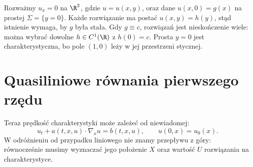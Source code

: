 \begin{kontrprzyklad}
\label{ex:pde2-char-data}
Rozważmy $u_x=0$ na $\R^2$, gdzie $u=u(x,y)$,
oraz dane $u(x,0)=g(x)$ na prostej $\Sigma=\{y=0\}$.
Każde rozwiązanie ma postać $u(x,y)=h(y)$, stąd
istnienie wymaga, by $g$ była stała. Gdy $g\equiv c$,
rozwiązań jest nieskończenie wiele: można wybrać
dowolne $h\in C^1(\R)$ z $h(0)=c$. Prosta $y=0$
jest charakterystyczna, bo pole $(1,0)$ leży
w jej przestrzeni stycznej.
\end{kontrprzyklad}

\section{Quasiliniowe równania pierwszego rzędu}
\label{sec:pde2-quasilinear}

Teraz prędkość charakterystyki może zależeć od niewiadomej:
\begin{equation}\label{eq:pde2-quasilinear}
 u_t+a(t,x,u)\cdot\nabla_xu=b(t,x,u),
 \qquad u(0,x)=u_0(x).
\end{equation}
W odróżnieniu od przypadku liniowego nie znamy przepływu
z góry: równocześnie musimy wyznaczać jego położenie
$X$ oraz wartość $U$ rozwiązania na charakterystyce.

